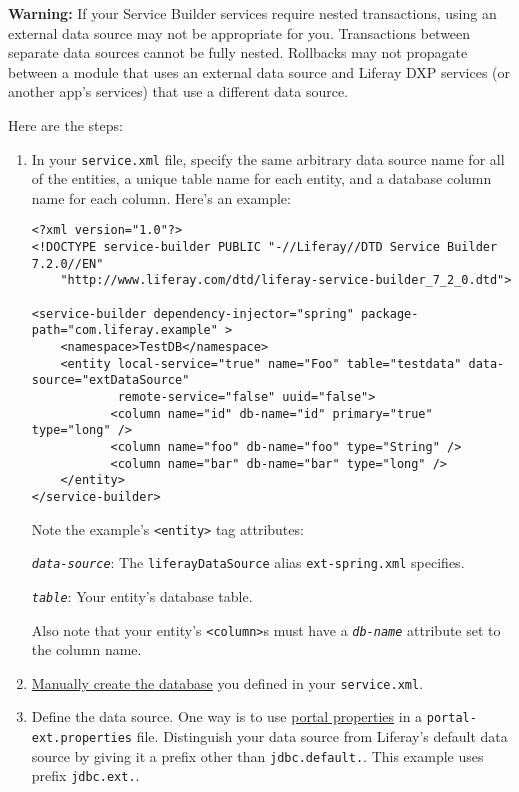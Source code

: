\noindent\hrulefill

\textbf{Warning:} If your Service Builder services require nested
transactions, using an external data source may not be appropriate for
you. Transactions between separate data sources cannot be fully nested.
Rollbacks may not propagate between a module that uses an external data
source and Liferay DXP services (or another app's services) that use a
different data source.

\noindent\hrulefill

Here are the steps:

\begin{enumerate}
\def\labelenumi{\arabic{enumi}.}
\item
  In your \texttt{service.xml} file, specify the same arbitrary data
  source name for all of the entities, a unique table name for each
  entity, and a database column name for each column. Here's an example:

\begin{verbatim}
<?xml version="1.0"?>
<!DOCTYPE service-builder PUBLIC "-//Liferay//DTD Service Builder 7.2.0//EN"
    "http://www.liferay.com/dtd/liferay-service-builder_7_2_0.dtd">

<service-builder dependency-injector="spring" package-path="com.liferay.example" >
    <namespace>TestDB</namespace>
    <entity local-service="true" name="Foo" table="testdata" data-source="extDataSource"
            remote-service="false" uuid="false">
           <column name="id" db-name="id" primary="true" type="long" />
           <column name="foo" db-name="foo" type="String" />
           <column name="bar" db-name="bar" type="long" />
    </entity>
</service-builder>
\end{verbatim}

  Note the example's \texttt{\textless{}entity\textgreater{}} tag
  attributes:

  \emph{\texttt{data-source}}: The \texttt{liferayDataSource} alias
  \texttt{ext-spring.xml} specifies.

  \emph{\texttt{table}}: Your entity's database table.

  Also note that your entity's \texttt{\textless{}column\textgreater{}}s
  must have a \emph{\texttt{db-name}} attribute set to the column name.
\item
  \href{https://learn.liferay.com/dxp/latest/en/installation-and-upgrades/installing-liferay/configuring-a-database.html}{Manually
  create the database} you defined in your \texttt{service.xml}.
\item
  Define the data source. One way is to use
  \href{/docs/7-2/deploy/-/knowledge_base/d/portal-properties}{portal
  properties} in a \texttt{portal-ext.properties} file. Distinguish your
  data source from Liferay's default data source by giving it a prefix
  other than \texttt{jdbc.default.}. This example uses prefix
  \texttt{jdbc.ext.}.


\end{enumerate}
